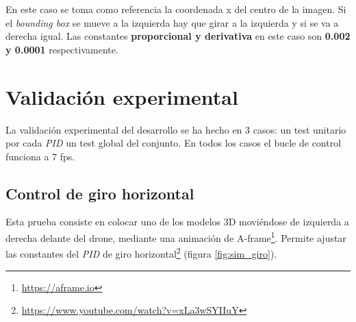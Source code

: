 En este caso se toma como referencia la coordenada x del centro de la imagen. Si el \textit{bounding box} se mueve a la izquierda hay que girar a la izquierda y si se va a derecha igual. Las constantes \textbf{proporcional y derivativa} en este caso son \textbf{0.002 y 0.0001} respectivamente.

\section{Validación experimental}
La validación experimental del desarrollo se ha hecho en 3 casos: un test unitario por cada \textit{PID}  un test global del conjunto. En todos los casos el bucle de control funciona a 7 \acrshort{fps}.

\subsection*{Control de giro horizontal}
Esta prueba consiste en colocar uno de los modelos 3D moviéndose de izquierda a derecha delante del drone, mediante una animación de A-frame\footnote{\url{https://aframe.io}}. Permite ajustar las constantes del \textit{PID} de giro horizontal\footnote{\url{https://www.youtube.com/watch?v=xLa3wSYIIuY}} (figura \ref{fig:sim_giro}).

